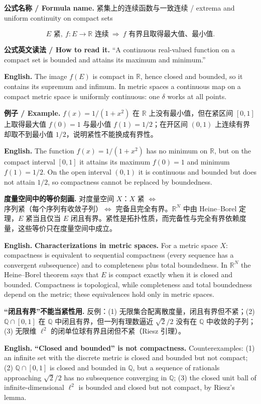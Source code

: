 \documentclass[UTF8,11pt,a4paper]{ctexart}
\newcommand{\EN}[1]{\par\noindent\textbf{English.} #1\par}
\newcommand{\READ}[1]{\par\noindent\textbf{公式英文读法 / How to read it.} #1\par}
\newcommand{\FORMULA}[2]{\par\noindent\textbf{公式名称 / Formula name.} #1 / #2\par}
\newcommand{\EX}[2]{\par\noindent\textbf{例子 / Example.} #1\par\EN{#2}}
\begin{document}
\FORMULA{紧集上的连续函数与一致连续}{extrema and uniform continuity on compact sets}
\[
E\text{ 紧},\ f:E\to\mathbb R\text{ 连续}
\ \Longrightarrow\
f\text{ 有界且取得最大值、最小值}.
\]
\READ{``A continuous real-valued function on a compact set is bounded and attains its maximum and minimum.''}
\EN{The image $f(E)$ is compact in $\mathbb R$, hence closed and bounded, so it contains its supremum and infimum. In metric spaces a continuous map on a compact metric space is uniformly continuous: one $\delta$ works at all points.}

\EX{$f(x)=1/(1+x^2)$ 在 $\mathbb R$ 上没有最小值，但在紧区间 $[0,1]$ 上取得最大值 $f(0)=1$ 与最小值 $f(1)=1/2$；在开区间 $(0,1)$ 上连续有界却取不到最小值 $1/2$，说明紧性不能换成有界性。}{The function $f(x)=1/(1+x^2)$ has no minimum on $\mathbb R$, but on the compact interval $[0,1]$ it attains its maximum $f(0)=1$ and minimum $f(1)=1/2$. On the open interval $(0,1)$ it is continuous and bounded but does not attain $1/2$, so compactness cannot be replaced by boundedness.}

\noindent\textbf{度量空间中的等价刻画.} 对度量空间 $X$：$X$ 紧 $\iff$ 序列紧（每个序列有收敛子列）$\iff$ 完备且完全有界。$\mathbb R^N$ 中由 Heine--Borel 定理，$E$ 紧当且仅当 $E$ 闭且有界。紧性是拓扑性质，而完备性与完全有界依赖度量，这些等价只在度量空间中成立。
\EN{\textbf{Characterizations in metric spaces.} For a metric space $X$: compactness is equivalent to sequential compactness (every sequence has a convergent subsequence) and to completeness plus total boundedness. In $\mathbb R^N$ the Heine--Borel theorem says that $E$ is compact exactly when it is closed and bounded. Compactness is topological, while completeness and total boundedness depend on the metric; these equivalences hold only in metric spaces.}

\noindent\textbf{“闭且有界”不能当紧性用.} 反例：(1) 无限集合配离散度量，闭且有界但不紧；(2) $\mathbb Q\cap[0,1]$ 在 $\mathbb Q$ 中闭且有界，但一列有理数逼近 $\sqrt2/2$ 没有在 $\mathbb Q$ 中收敛的子列；(3) 无限维 $\ell^2$ 的闭单位球有界且闭但不紧（Riesz 引理）。
\EN{\textbf{``Closed and bounded'' is not compactness.} Counterexamples: (1) an infinite set with the discrete metric is closed and bounded but not compact; (2) $\mathbb Q\cap[0,1]$ is closed and bounded in $\mathbb Q$, but a sequence of rationals approaching $\sqrt2/2$ has no subsequence converging in $\mathbb Q$; (3) the closed unit ball of infinite-dimensional $\ell^2$ is bounded and closed but not compact, by Riesz's lemma.}
\end{document}
